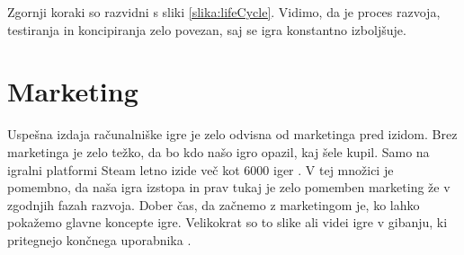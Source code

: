 \documentclass[12pt,a4paper,twoside]{book}
\begin{document}
Zgornji koraki so razvidni s sliki \ref{slika:lifeCycle}. Vidimo, da je proces razvoja, testiranja in koncipiranja zelo povezan, saj se igra konstantno izboljšuje.

\section{Marketing}
Uspešna izdaja računalniške igre je zelo odvisna od marketinga pred izidom. Brez marketinga je zelo težko, da bo kdo našo igro opazil, kaj šele kupil. Samo na igralni platformi Steam letno izide več kot 6000 iger \cite{james6000Games}. V tej množici je pomembno, da naša igra izstopa in prav tukaj je zelo pomemben marketing že v zgodnjih fazah razvoja. Dober čas, da začnemo z marketingom je, ko lahko pokažemo glavne koncepte igre. Velikokrat so to slike ali videi igre v gibanju, ki pritegnejo končnega uporabnika \cite{robertMarketing}.
\end{document}
